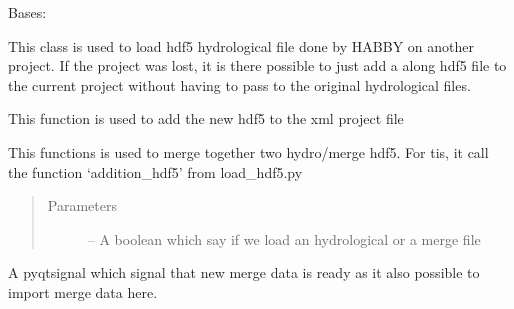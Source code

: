 \documentclass[letterpaper,10pt,english]{sphinxmanual}
\begin{document}
\begin{fulllineitems}
\label{\detokenize{index:src_GUI.hydro_GUI_2.HabbyHdf5}}
Bases: {\hyperref[\detokenize{index:src_GUI.hydro_GUI_2.SubHydroW}]{}}

This class is used to load hdf5 hydrological file done by HABBY on another project. If the project was lost,
it is there possible to just add a along hdf5 file to the current project without having to pass to the original
hydrological files.

\begin{fulllineitems}
\label{\detokenize{index:src_GUI.hydro_GUI_2.HabbyHdf5.add_new_hdf5_to_xml}}
This function is used to add the new hdf5 to the xml project file

\end{fulllineitems}


\begin{fulllineitems}
\label{\detokenize{index:src_GUI.hydro_GUI_2.HabbyHdf5.add_two_hdf5}}
This functions is used to merge together two hydro/merge hdf5. For tis, it call the function `addition\_hdf5'
from load\_hdf5.py
\begin{quote}\begin{description}
\item[{Parameters}] \leavevmode
{} -- A boolean which say if we load an hydrological or a merge file

\end{description}\end{quote}

\end{fulllineitems}


\begin{fulllineitems}
\label{\detokenize{index:src_GUI.hydro_GUI_2.HabbyHdf5.drop_merge}}
A pyqtsignal which signal that new merge data is ready as it also possible to import merge data here.


\end{fulllineitems}
\end{fulllineitems}
\end{document}
